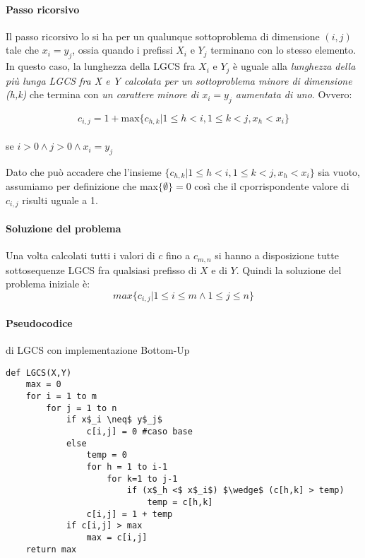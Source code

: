 \documentclass[12pt, a4paper, openany]{book}
\begin{document}
\paragraph*{Passo ricorsivo}
Il passo ricorsivo lo si ha per un qualunque sottoproblema di dimensione $(i,j)$ tale che $x_i = y_j$, ossia quando i prefissi $X_i$ e $Y_j$ terminano con lo stesso elemento.
\\In questo caso, la lunghezza della LGCS fra $X_i$ e $Y_j$ è uguale alla \emph{lunghezza della più lunga LGCS fra X e Y calcolata per un sottoproblema minore di dimensione (h,k)}
che termina con \emph{un carattere minore di $x_i = y_j$ aumentata di uno}.
Ovvero:

\begin{center}
	$$c_{i,j} = 1 + \text{max}\{c_{h,k} | 1 \leq h < i, 1 \leq k < j, x_h < x_i\}$$
	\\se $i>0\wedge j>0 \wedge x_i = y_j$
\end{center}

Dato che può accadere che l'insieme $\{c_{h,k} | 1 \leq h < i, 1 \leq k < j, x_h < x_i\}$ sia vuoto, assumiamo per definizione che max$\{\emptyset\} = 0$
così che il cporrispondente valore di $c_{i,j}$ risulti uguale a 1.

\paragraph*{Soluzione del problema}
Una volta calcolati tutti i valori di $c$ fino a $c_{m,n}$ si hanno a disposizione tutte sottosequenze LGCS fra qualsiasi prefisso di $X$ e di $Y$.
Quindi la soluzione del problema iniziale è:
\begin{equation*}
	max\{c_{i,j} | 1\leq i\leq m \wedge 1 \leq j \leq n \}
\end{equation*}

\paragraph*{Pseudocodice} di LGCS con implementazione Bottom-Up

\begin{lstlisting}
def LGCS(X,Y)
	max = 0
	for i = 1 to m
		for j = 1 to n
			if x$_i \neq$ y$_j$
				c[i,j] = 0 #caso base
			else
				temp = 0
				for h = 1 to i-1
					for k=1 to j-1
						if (x$_h <$ x$_i$) $\wedge$ (c[h,k] > temp)
							temp = c[h,k]
				c[i,j] = 1 + temp
			if c[i,j] > max
				max = c[i,j]
	return max
\end{lstlisting}
\end{document}
